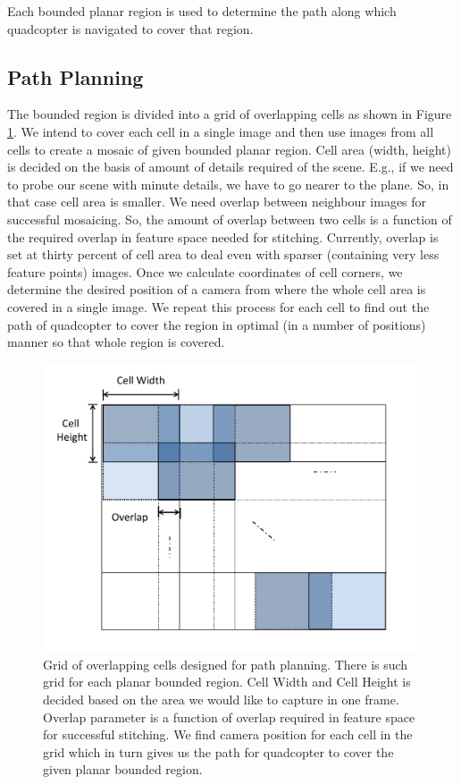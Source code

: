 Each bounded planar region is used to determine the path along which
quadcopter is navigated to cover that region.

\subsection{Path Planning}
The bounded region is divided into a grid of overlapping cells as shown in
Figure \ref{fig:grid}. We intend to cover each cell in a single image and then
use images from all cells to create a mosaic of given bounded planar
region. Cell area (width, height) is decided on the basis of amount of details required of the
scene. E.g., if we need to probe our scene with minute details, we have to go
nearer to the plane. So, in that case cell area is smaller. We need
overlap between neighbour images for successful mosaicing. So, the amount of
overlap between two cells is a function of the required overlap in feature space
needed for stitching. Currently, overlap is set at thirty percent of cell area to deal
even with sparser (containing very less feature points) images. Once we
calculate coordinates of cell corners, we determine the desired position of
a camera from where the whole cell area is covered in a single image. We repeat
this process for each cell to find out the path of quadcopter to cover the region in
optimal (in a number of positions) manner so that whole region is covered.

\begin{figure}[h!]
\centering
\includegraphics[width=\linewidth]{figures/multiplanar/PathPlanningGrid}
\caption[Path planning]{Grid of overlapping cells designed for path planning.
There is such grid for each planar bounded region. Cell Width and Cell Height is decided based
on the area we would like to capture in one frame. Overlap parameter is
a function of overlap required in feature space for successful stitching.
We find camera position for each cell in the grid which in turn
gives us the path for quadcopter to cover the given planar bounded region.}
\label{fig:grid}
\end{figure}

